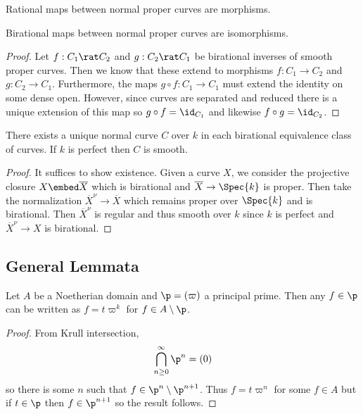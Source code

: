 \begin{cor}
Rational maps between normal proper curves are morphisms.
\end{cor}

\begin{cor}
Birational maps between normal proper curves are isomorphisms.
\end{cor}

\begin{proof}
Let $f : C_1 \rat C_2$ and $g : C_2 \rat C_1$ be birational inverses of smooth proper curves. Then we know that these extend to morphisms $f : C_1 \to C_2$ and $g : C_2 \to C_1$. Furthermore, the maps $g \circ f : C_1 \to C_1$ must extend the identity on some dense open. However, since curves are separated and reduced there is a unique extension of this map so $g \circ f = \id_{C_1}$ and likewise $f \circ g = \id_{C_2}$. 
\end{proof}

\begin{thm}
There exists a unique normal curve $C$ over $k$ in each birational equivalence class of curves. If $k$ is perfect then $C$ is smooth.
\end{thm}

\begin{proof}
It suffices to show existence. Given a curve $X$, we consider the projective closure $X \embed \overline{X}$ which is birational and $\overline{X} \to \Spec{k}$ is proper. Then take the normalization $\overline{X}^\nu \to \overline{X}$ which remains proper over $\Spec{k}$ and is birational. Then $\overline{X}^\nu$ is regular and thus smooth over $k$ since $k$ is perfect and $\overline{X}^\nu \to X$ is birational.
\end{proof}

\subsection{General Lemmata}

\begin{lemma} \label{principal_ideal_powers}
Let $A$ be a Noetherian domain and $\p = (\varpi)$ a principal prime. Then any $f \in \p$ can be written as $f = t \varpi^k$ for $f \in A \setminus \p$. 
\end{lemma}

\begin{proof}
From Krull intersection,
\[ \bigcap_{n \ge 0}^\infty \p^n = (0) \]
so there is some $n$ such that $f \in \p^n \setminus \p^{n+1}$. Thus $f = t \varpi^n$ for some $f \in A$ but if $t \in \p$ then $f \in \p^{n+1}$ so the result follows.
\end{proof}


